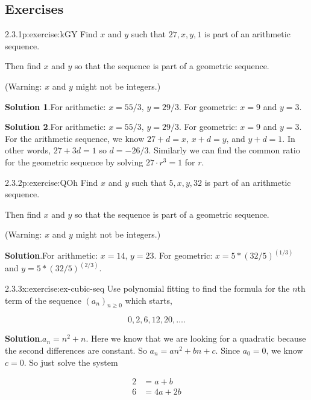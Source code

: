 \documentclass[twoside,11pt,]{book}
\newcommand{\blocktitlefont}{\relax}
\numberwithin{equation}{chapter}
\newcommand{\amp}{&}
\begin{document}
\subsection*{Exercises}
\begin{divisionsolution}{2.3.1}{}{p:exercise:kGY}%
Find \(x\) and \(y\) such that \(27,
x, y, 1\) is part of an arithmetic sequence.%
\par
Then find \(x\) and \(y\) so that the sequence is part of a geometric sequence.%
\par
(Warning: \(x\) and \(y\) might not be integers.)%
\par\smallskip%
\noindent\textbf{\blocktitlefont Solution 1}.\quad{}For arithmetic: \(x = 55/3\text{,}\) \(y = 29/3\text{.}\) For geometric: \(x = 9\) and \(y = 3\text{.}\)%
\par\smallskip%
\noindent\textbf{\blocktitlefont Solution 2}.\quad{}For arithmetic: \(x = 55/3\text{,}\) \(y = 29/3\text{.}\) For geometric: \(x = 9\) and \(y = 3\text{.}\) For the arithmetic sequence, we know \(27 + d = x\text{,}\) \(x + d = y\text{,}\) and \(y + d = 1\text{.}\) In other words, \(27 + 3d = 1\) so \(d = -26/3\text{.}\) Similarly we can find the common ratio for the geometric sequence by solving \(27\cdot r^3 = 1\) for \(r\text{.}\)%
\end{divisionsolution}%
\begin{divisionsolution}{2.3.2}{}{p:exercise:QOh}%
Find \(x\) and \(y\) such that \(5,
x, y, 32\) is part of an arithmetic sequence.%
\par
Then find \(x\) and \(y\) so that the sequence is part of a geometric sequence.%
\par
(Warning: \(x\) and \(y\) might not be integers.)%
\par\smallskip%
\noindent\textbf{\blocktitlefont Solution}.\quad{}For arithmetic: \(x = 14\text{,}\) \(y = 23\text{.}\) For geometric: \(x = 5*(32/5)^(1/3)\) and \(y = 5*(32/5)^(2/3)\text{.}\)%
\end{divisionsolution}%
\begin{divisionsolution}{2.3.3}{}{x:exercise:ex-cubic-seq}%
Use polynomial fitting to find the formula for the \(n\)th term of the sequence \((a_n)_{n \ge 0}\) which starts,%
\par
%
\begin{equation*}
0, 2, 6, 12, 20, \ldots 
\text{.}
\end{equation*}
%
\par\smallskip%
\noindent\textbf{\blocktitlefont Solution}.\quad{}\(a_n = n^2 + n\text{.}\) Here we know that we are looking for a quadratic because the second differences are constant. So \(a_n = an^2 + bn + c\text{.}\) Since \(a_0 = 0\text{,}\) we know \(c= 0\text{.}\) So just solve the system%
\par
%
\begin{equation*}
\begin{aligned}
2 \amp = a + b\\
6 \amp = 4a + 2b
\end{aligned}
\end{equation*}
%
\end{divisionsolution}%
\end{document}
